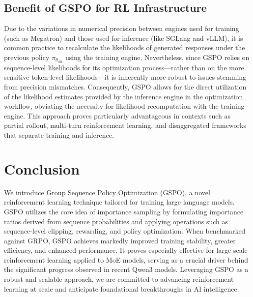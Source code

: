 \subsection{Benefit of GSPO for RL Infrastructure}

Due to the variations in numerical precision between engines used for training (such as Megatron) and those used for inference (like SGLang and vLLM), it is common practice to recalculate the likelihoods of generated responses under the previous policy $\pi_{\theta_\text{old}}$ using the training engine. Nevertheless, since GSPO relies on sequence-level likelihoods for its optimization process—rather than on the more sensitive token-level likelihoods—it is inherently more robust to issues stemming from precision mismatches. Consequently, GSPO allows for the direct utilization of the likelihood estimates provided by the inference engine in the optimization workflow, obviating the necessity for likelihood recomputation with the training engine. This approach proves particularly advantageous in contexts such as partial rollout, multi-turn reinforcement learning, and disaggregated frameworks that separate training and inference.

\section{Conclusion}

We introduce Group Sequence Policy Optimization (GSPO), a novel reinforcement learning technique tailored for training large language models. GSPO utilizes the core idea of importance sampling by formulating importance ratios derived from sequence probabilities and applying operations such as sequence-level clipping, rewarding, and policy optimization. When benchmarked against GRPO, GSPO achieves markedly improved training stability, greater efficiency, and enhanced performance. It proves especially effective for large-scale reinforcement learning applied to MoE models, serving as a crucial driver behind the significant progress observed in recent Qwen3 models. Leveraging GSPO as a robust and scalable approach, we are committed to advancing reinforcement learning at scale and anticipate foundational breakthroughs in AI intelligence.

